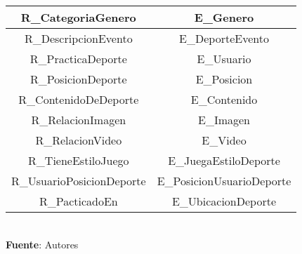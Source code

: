 \begin{table}[!htb]
\begin{center}
{\begin{tabular}{|p{4cm}|p{4cm}|p{4cm}|p{4cm}|}
			\hline
			\multicolumn{2}{|c|}{R\_CategoriaGenero} & 
			\multicolumn{2}{c|}{E\_Genero} \\
			\hline
			\multicolumn{2}{|c|}{R\_DescripcionEvento} & 
			\multicolumn{2}{c|}{E\_DeporteEvento} \\
			\hline
			\multicolumn{2}{|c|}{R\_PracticaDeporte} & 
			\multicolumn{2}{c|}{E\_Usuario} \\
			\hline
			\multicolumn{2}{|c|}{R\_PosicionDeporte} & 
			\multicolumn{2}{c|}{E\_Posicion} \\
			\hline
			\multicolumn{2}{|c|}{R\_ContenidoDeDeporte} & 
			\multicolumn{2}{c|}{E\_Contenido} \\
			\hline
			\multicolumn{2}{|c|}{R\_RelacionImagen} & 
			\multicolumn{2}{c|}{E\_Imagen} \\
			\hline
			\multicolumn{2}{|c|}{R\_RelacionVideo} & 
			\multicolumn{2}{c|}{E\_Video} \\
			\hline
			\multicolumn{2}{|c|}{R\_TieneEstiloJuego} & 
			\multicolumn{2}{c|}{E\_JuegaEstiloDeporte} \\
			\hline
			\multicolumn{2}{|c|}{R\_UsuarioPosicionDeporte} & 
			\multicolumn{2}{c|}{E\_PosicionUsuarioDeporte} \\
			\hline
			\multicolumn{2}{|c|}{R\_PacticadoEn} & 
			\multicolumn{2}{c|}{E\_UbicacionDeporte} \\
			\hline
		\end{tabular}
		} \\
		\textbf{Fuente}: Autores
	\end{center}
\end{table}